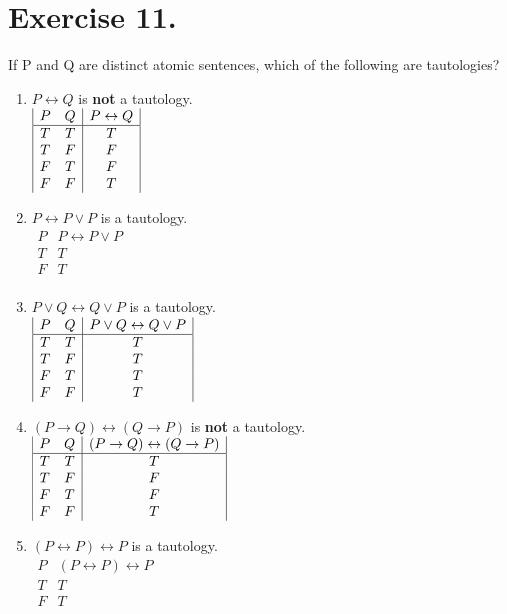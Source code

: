 \documentclass{article}
\begin{document}
\section*{Exercise 11.}
If P and Q are distinct atomic sentences, which of the following are tautologies?
\singlespace
\begin{enumerate}[label=(\alph*)]

\item \(P \leftrightarrow Q\) is \textbf{not} a tautology.\\
\(
\begin{array}{|c c|c|}
P & Q & P \leftrightarrow Q\\
\hline
T & T & T\\
T & F & F\\
F & T & F\\
F & F & T\\
\end{array}
\)
\medskip

\item \(P \leftrightarrow P \lor P\) is a tautology.\\
\(
\begin{array}{|c|c|}
P  & P \leftrightarrow P \lor P\\
\hline
T & T\\
F & T\\
\end{array}
\)
\medskip

\item \(P \lor Q \leftrightarrow Q \lor P\) is a tautology.\\
\(
\begin{array}{|c c|c|}
P & Q & P \lor Q \leftrightarrow Q \lor P\\
\hline
T & T & T\\
T & F & T\\
F & T & T\\
F & F & T\\
\end{array}
\)
\medskip

\item \((P \rightarrow Q) \leftrightarrow (Q \rightarrow P)\) is \textbf{not} a tautology.\\
\(
\begin{array}{|c c|c|}
P & Q & (P \rightarrow Q) \leftrightarrow (Q \rightarrow P)\\
\hline
T & T & T\\
T & F & F\\
F & T & F\\
F & F & T\\
\end{array}
\)
\medskip

\item \((P \leftrightarrow P) \leftrightarrow P\) is a tautology.\\
\(
\begin{array}{|c|c|}
P  & (P \leftrightarrow P) \leftrightarrow P\\
\hline
T & T\\
F & T\\
\end{array}
\)
\medskip
\end{enumerate}
\end{document}
